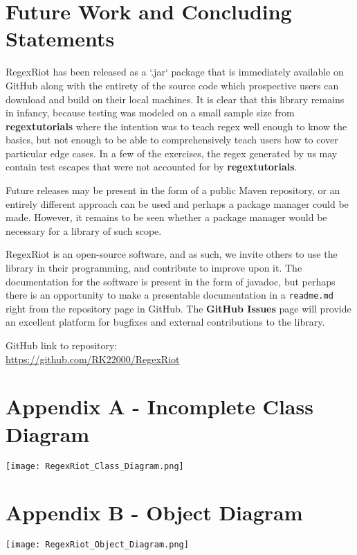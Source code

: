 \documentclass[conference]{IEEEtran}
\begin{document}
\section{Future Work and Concluding Statements}

RegexRiot has been released as a `.jar` package that is immediately available
on GitHub along with the entirety of the source code which prospective users
can download and build on their local machines. It is clear that this library
remains in infancy, because testing was modeled on a small sample size from
\textbf{regextutorials} where the intention was to
teach regex well enough to know the basics, but not enough to be able to
comprehensively teach users how to cover particular edge cases.
In a few of the exercises, the regex generated by us may contain test escapes
that were not accounted for by \textbf{regextutorials}.\cite{regextutorials}

Future releases may be present in the form of a public Maven repository,
or an entirely different approach can be used and perhaps a package manager
could be made. However, it remains to be seen whether a package manager would
be necessary for a library of such scope.

RegexRiot is an open-source software, and as such, we invite others to use the library
in their programming, and contribute to improve upon it. The documentation for
the software is present in the form of javadoc, but perhaps there is an
opportunity to make a presentable documentation in a \texttt{readme.md}
right from the repository page in GitHub. The \textbf{GitHub Issues} page will provide
an excellent platform for bugfixes and external contributions to the library.

GitHub link to repository:\\
\url{https://github.com/RK22000/RegexRiot}




\onecolumn
\appendices
\section*{Appendix A - Incomplete Class Diagram}
\centering
\texttt{[image: RegexRiot\_Class\_Diagram.png]}
\label{appendix:classdiagram}

\section*{Appendix B - Object Diagram}
\centering
\texttt{[image: RegexRiot\_Object\_Diagram.png]}
\label{appendix:objdiagram}
\end{document}
